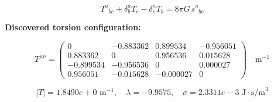 
\begin{equation}
  T^a{}_{bc} + \delta^a_b T_c - \delta^a_c T_b = 8\pi G \, s^a{}_{bc}
\end{equation}

\textbf{Discovered torsion configuration:}

\begin{equation}
  T^{\mu\nu} = \begin{pmatrix}
    0 & -0.883362 & 0.899534 & -0.956051 \\
    0.883362 & 0 & 0.956536 & 0.015628 \\
    -0.899534 & -0.956536 & 0 & 0.000027 \\
    0.956051 & -0.015628 & -0.000027 & 0
  \end{pmatrix} \quad \text{m}^{-1}
\end{equation}

\begin{equation}
  |T| = 1.8490e+0 \text{ m}^{-1}, \quad
  \lambda = -9.9575, \quad
  \sigma = 2.3311e-3 \text{ J}\cdot\text{s/m}^3
\end{equation}